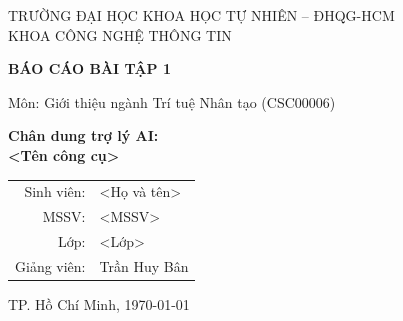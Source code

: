\documentclass[12pt,a4paper]{article}
\newif\ifhuongB
\begin{document}
\begin{titlepage}
  \centering
  {\large TRƯỜNG ĐẠI HỌC KHOA HỌC TỰ NHIÊN -- ĐHQG-HCM\\
   KHOA CÔNG NGHỆ THÔNG TIN\par}
  \vspace{3.5cm}
  {\Large\bfseries BÁO CÁO BÀI TẬP 1\par}
  \vspace{0.3cm}
  {\large Môn: Giới thiệu ngành Trí tuệ Nhân tạo (CSC00006)\par}
  \vspace{1.2cm}
  \ifhuongB
    {\huge\bfseries Đọ sức chatbot:\\ <Chatbot 1> vs <Chatbot 2>\par}
  \else
    {\huge\bfseries Chân dung trợ lý AI:\\ <Tên công cụ>\par}
  \fi
  \vfill
  \begin{tabular}{rl}
    Sinh viên: & <Họ và tên> \\
    MSSV:      & <MSSV> \\
    Lớp:       & <Lớp> \\
    Giảng viên:& Trần Huy Bân \\
  \end{tabular}
  \par\vspace{1.5cm}
  TP. Hồ Chí Minh, \today
\end{titlepage}

\begin{abstract}
<Viết 4--6 câu: bạn tìm hiểu công cụ nào / so sánh những chatbot nào,
làm bằng cách nào, và phát hiện quan trọng nhất là gì.
Viết phần này SAU CÙNG.>
\end{abstract}

\tableofcontents
\newpage

\ifhuongB

\end{document}
